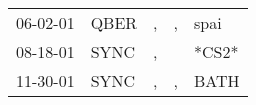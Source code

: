 \begin{supertabular}{lllll}
 06-02-01 &  QBER &  , &  , &   spai \\
 08-18-01 &  SYNC &  , &    &  *CS2* \\
 11-30-01 &  SYNC &  , &  , &   BATH \\
\end{supertabular}
